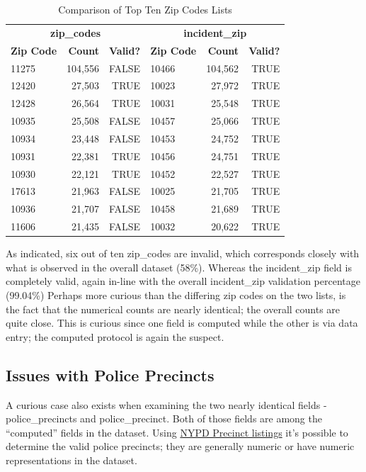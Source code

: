 \documentclass[12pt, titlepage]{article}
\begin{document}
	\begin{table}[H]
	\centering
	\footnotesize
	\caption{Comparison of Top Ten Zip Codes Lists}
	\begin{tabular}{lrr@{\hskip 0.5cm}|@{\hskip 0.5cm}lrr}
	\toprule
	\multicolumn{3}{c}{\textbf{zip\_codes}} & \multicolumn{3}{c}{\textbf{incident\_zip}} \\
	\cmidrule(r){1-3} \cmidrule(l){4-6}
	\textbf{Zip Code} & \textbf{Count} & \textbf{Valid?} & \textbf{Zip Code} & \textbf{Count} & \textbf{Valid?} \\
		\midrule
		11275 & 104,556 & FALSE & 10466 & 104,562 & TRUE \\
		12420 & 27,503 & TRUE & 10023 & 27,972 & TRUE \\
		12428 & 26,564 & TRUE & 10031 & 25,548 & TRUE \\
		10935 & 25,508 & FALSE & 10457 & 25,066 & TRUE \\
		10934 & 23,448 & FALSE & 10453 & 24,752 & TRUE \\
		10931 & 22,381 & TRUE & 10456 & 24,751 & TRUE \\
		10930 & 22,121 & TRUE & 10452 & 22,527 & TRUE \\
		17613 & 21,963 & FALSE & 10025 & 21,705 & TRUE \\
		10936 & 21,707 & FALSE & 10458 & 21,689 & TRUE \\
		11606 & 21,435 & FALSE & 10032 & 20,622 & TRUE \\
		\bottomrule
	\end{tabular}
	\end{table}

	As indicated, six out of ten zip\_codes are invalid, which corresponds closely with what is observed in the overall dataset (58\%). Whereas the incident\_zip
	field is completely valid, again in-line with the overall incident\_zip validation percentage (99.04\%)
	Perhaps more curious than the differing zip codes on the two lists, is the fact that the numerical counts are nearly identical;  the overall counts are quite close. This is curious since
	one field is computed while the other is via data entry; the computed protocol is again the suspect.

	
	\subsection{Issues with Police Precincts}
	A curious case also exists when examining the two nearly identical fields - police\_precincts and police\_precinct. Both of those fields are among
	the ``computed'' fields in the dataset. 
	Using  \href{https://www.nyc.gov/site/nypd/bureaus/patrol/precincts-landing.page}{NYPD Precinct listings} it's possible to determine the valid
	police precincts; they are generally numeric or have numeric representations in the dataset. 
	
\end{document}
